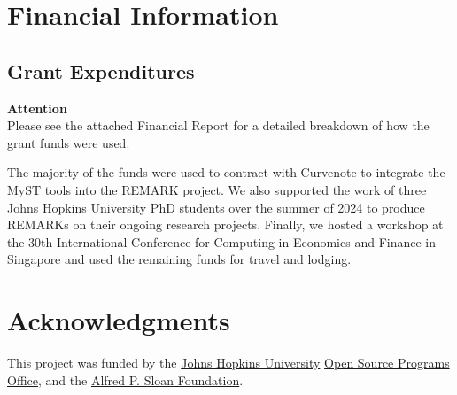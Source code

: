 \documentclass{article}
\begin{document}



\section{Financial Information}

\subsection{Grant Expenditures}


\begin{framed}
\textbf{Attention}\\
Please see the attached Financial Report for a detailed breakdown of how the grant funds were used.
\end{framed}

The majority of the funds were used to contract with Curvenote to integrate the MyST tools into the REMARK project. We also supported the work of three Johns Hopkins University PhD students over the summer of 2024 to produce REMARKs on their ongoing research projects. Finally, we hosted a workshop at the 30th International Conference for Computing in Economics and Finance in Singapore and used the remaining funds for travel and lodging.



\section*{Acknowledgments}
This project was funded by the \href{https://jhu.edu}{Johns Hopkins University} \href{https://ospo.library.jhu.edu/}{Open Source Programs Office}, and the \href{https://sloan.org}{Alfred P. Sloan Foundation}.
\end{document}
